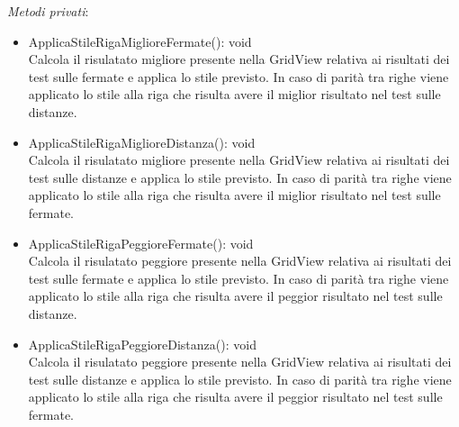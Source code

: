 \textit{Metodi privati}:\\
\begin{itemize}
    \item ApplicaStileRigaMiglioreFermate(): void\\
    Calcola il risulatato migliore presente nella GridView relativa ai risultati dei test sulle fermate e applica lo stile previsto.
    In caso di parità tra righe viene applicato lo stile alla riga che risulta avere il miglior risultato nel test sulle distanze.
    \item ApplicaStileRigaMiglioreDistanza(): void \\
    Calcola il risulatato migliore presente nella GridView relativa ai risultati dei test sulle distanze e applica lo stile previsto.
    In caso di parità tra righe viene applicato lo stile alla riga che risulta avere il miglior risultato nel test sulle fermate.
    \item ApplicaStileRigaPeggioreFermate(): void \\
    Calcola il risulatato peggiore presente nella GridView relativa ai risultati dei test sulle fermate e applica lo stile previsto.
    In caso di parità tra righe viene applicato lo stile alla riga che risulta avere il peggior risultato nel test sulle distanze.
    \item ApplicaStileRigaPeggioreDistanza(): void \\
    Calcola il risulatato peggiore presente nella GridView relativa ai risultati dei test sulle distanze e applica lo stile previsto.
    In caso di parità tra righe viene applicato lo stile alla riga che risulta avere il peggior risultato nel test sulle fermate.
\end{itemize} 

